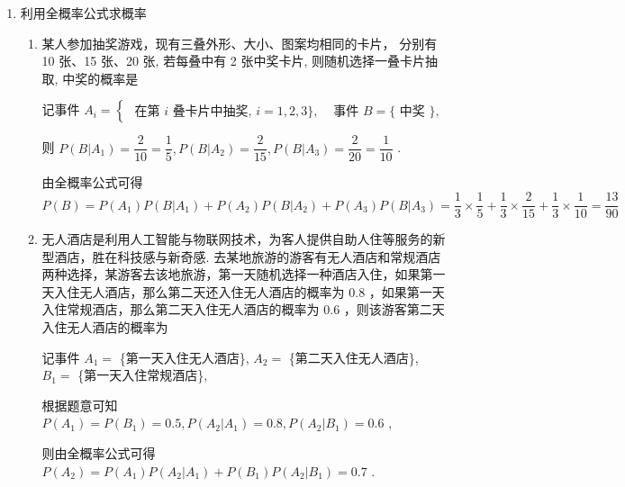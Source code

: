 \begin{enumerate}
\begin{enumerate}
\begin{jieda}
            $P\left( {\bar{A}BC}\right) = P\left( {\bar{A}B}\right)  = \left( {1 - {0.5}}\right)  \times  {0.4} = {0.2}$，$P\left( {\left( {\bar{A}B}\right) |C}\right)  = \dfrac{0.2}{0.7} = \dfrac{2}{7}$
        \end{jieda}
    \end{enumerate}
    \item 利用全概率公式求概率
    \begin{enumerate}
        \item 某人参加抽奖游戏，现有三叠外形、大小、图案均相同的卡片， 分别有 10 张、15 张、20 张, 若每叠中有 2 张中奖卡片, 则随机选择一叠卡片抽取, 中奖的概率是
        \begin{jieda}
            记事件 ${A}_{i} = \left\{  \begin{array}{ll} \text{ 在第 }i\text{ 叠卡片中抽奖, }i = 1,2,3\} , & \text{ 事件 }B = \{ \text{ 中奖 }\} , \end{array}\right.$
            
            则 $P\left( {B|{A}_{1}}\right)  = \dfrac{2}{10} = \dfrac{1}{5},P\left( {B|{A}_{2}}\right)  = \dfrac{2}{15},P\left( {B|{A}_{3}}\right)  = \dfrac{2}{20} = \dfrac{1}{10}$ .
            
            由全概率公式可得 $P\left( B\right)  = P\left( {A}_{1}\right) P\left( {B|{A}_{1}}\right)  + P\left( {A}_{2}\right) P\left( {B|{A}_{2}}\right)  + P\left( {A}_{3}\right) P\left( {B|{A}_{3}}\right) = \dfrac{1}{3} \times  \dfrac{1}{5} + \dfrac{1}{3} \times  \dfrac{2}{15} + \dfrac{1}{3} \times  \dfrac{1}{10} = \dfrac{13}{90}$
        \end{jieda}
        \item 无人酒店是利用人工智能与物联网技术，为客人提供自助人住等服务的新型酒店，胜在科技感与新奇感. 去某地旅游的游客有无人酒店和常规酒店两种选择，某游客去该地旅游，第一天随机选择一种酒店入住，如果第一天入住无人酒店，那么第二天还入住无人酒店的概率为 0.8 ，如果第一天入住常规酒店，那么第二天入住无人酒店的概率为 0.6 ，则该游客第二天入住无人酒店的概率为
        \begin{jieda}
            记事件 ${A}_{1} =$ \{第一天入住无人酒店\}, ${A}_{2} =$ \{第二天入住无人酒店\}, ${B}_{1} =$ \{第一天入住常规酒店\},
            
            根据题意可知 $P\left( {A}_{1}\right)  = P\left( {B}_{1}\right)  = {0.5},P\left( {{A}_{2}|{A}_{1}}\right)  = {0.8},P\left( {{A}_{2}|{B}_{1}}\right)  = {0.6}$ ,
            
            则由全概率公式可得 $P\left( {A}_{2}\right)  = P\left( {A}_{1}\right) P\left( {{A}_{2}|{A}_{1}}\right)  + P\left( {B}_{1}\right) P\left( {{A}_{2}|{B}_{1}}\right)  = {0.7}$ .
        \end{jieda}
        

\end{enumerate}
\end{enumerate}

